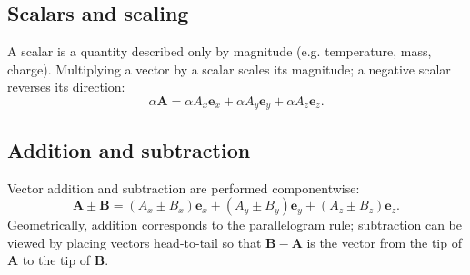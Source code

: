 



\subsection{Scalars and scaling}
A scalar is a quantity described only by magnitude (e.g. temperature, mass, charge). Multiplying a vector by a scalar scales its magnitude; a negative scalar reverses its direction:
\begin{equation}
    \alpha\mathbf{A}=\alpha A_x \mathbf{e}_x+\alpha A_y \mathbf{e}_y+\alpha A_z \mathbf{e}_z.
\end{equation}

\subsection{Addition and subtraction}
Vector addition and subtraction are performed componentwise:
\begin{equation}
    \mathbf{A}\pm\mathbf{B}=(A_x\pm B_x)\mathbf{e}_x+(A_y\pm B_y)\mathbf{e}_y+(A_z\pm B_z)\mathbf{e}_z.
\end{equation}
Geometrically, addition corresponds to the parallelogram rule; subtraction can be viewed by placing vectors head-to-tail so that $\mathbf{B}-\mathbf{A}$ is the vector from the tip of $\mathbf{A}$ to the tip of $\mathbf{B}$.

